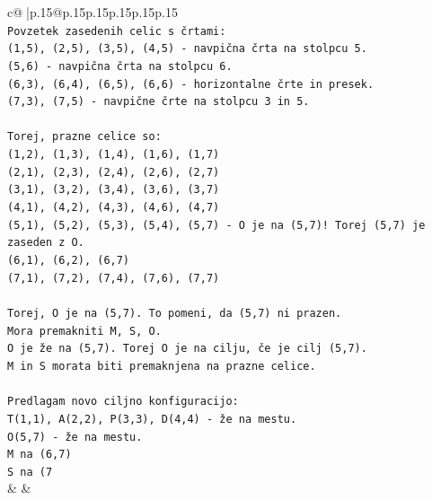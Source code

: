 \documentclass{article}
\begin{document}
{\begin{supertabular}{c@{$\;$}|p{.15\linewidth}@{}p{.15\linewidth}p{.15\linewidth}p{.15\linewidth}p{.15\linewidth}p{.15\linewidth}}
{{{\\ 
\texttt{Povzetek zasedenih celic s črtami:} \\
\texttt{(1,5), (2,5), (3,5), (4,5) {-} navpična črta na stolpcu 5.} \\
\texttt{(5,6) {-} navpična črta na stolpcu 6.} \\
\texttt{(6,3), (6,4), (6,5), (6,6) {-} horizontalne črte in presek.} \\
\texttt{(7,3), (7,5) {-} navpične črte na stolpcu 3 in 5.} \\
\\ 
\texttt{Torej, prazne celice so:} \\
\texttt{(1,2), (1,3), (1,4), (1,6), (1,7)} \\
\texttt{(2,1), (2,3), (2,4), (2,6), (2,7)} \\
\texttt{(3,1), (3,2), (3,4), (3,6), (3,7)} \\
\texttt{(4,1), (4,2), (4,3), (4,6), (4,7)} \\
\texttt{(5,1), (5,2), (5,3), (5,4), (5,7) {-} O je na (5,7)! Torej (5,7) je zaseden z O.} \\
\texttt{(6,1), (6,2), (6,7)} \\
\texttt{(7,1), (7,2), (7,4), (7,6), (7,7)} \\
\\ 
\texttt{Torej, O je na (5,7). To pomeni, da (5,7) ni prazen.} \\
\texttt{Mora premakniti M, S, O.} \\
\texttt{O je že na (5,7). Torej O je na cilju, če je cilj (5,7).} \\
\texttt{M in S morata biti premaknjena na prazne celice.} \\
\\ 
\texttt{Predlagam novo ciljno konfiguracijo:} \\
\texttt{T(1,1), A(2,2), P(3,3), D(4,4) {-} že na mestu.} \\
\texttt{O(5,7) {-} že na mestu.} \\
\texttt{M na (6,7)} \\
\texttt{S na (7} \\
            }
        }
    }
    & & \\ \\


\end{supertabular}}
\end{document}
